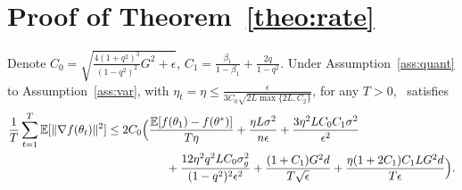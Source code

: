 \documentclass[11pt]{article}
\begin{document}
\section{Proof of Theorem~\ref{theo:rate}}

\begin{Theorem*}
Denote $C_0=\sqrt{\frac{4(1+q^2)^3}{(1-q^2)^2}G^2+\epsilon}$, $C_1=\frac{\beta_1}{1-\beta_1}+\frac{2q}{1-q^2}$. Under Assumption~\ref{ass:quant} to Assumption~\ref{ass:var}, with $\eta_t=\eta\leq \frac{\epsilon}{3C_0\sqrt{2L \max\{2L,C_2\}}}$, for any $T >0$, \algo\ satisfies
\begin{align*}
    \frac{1}{T}\sum_{t=1}^T \mathbb E[\|\nabla f(\theta_t)\|^2]
    &\leq 2C_0\Big(\frac{\mathbb E[f(\theta_1)-f(\theta^*)]}{T\eta}+\frac{\eta L \sigma^2}{n\epsilon}+\frac{3\eta^2 LC_0C_1\sigma^2}{\epsilon^2}  \\
    &\hspace{0.7in} + \frac{12\eta^2q^2LC_0\sigma_g^2}{(1-q^2)^2\epsilon^2}+\frac{ (1+C_1)G^2d}{T\sqrt\epsilon}+\frac{\eta (1+2C_1)C_1LG^2d}{T\epsilon} \Big).
\end{align*}
\end{Theorem*}
\end{document}
